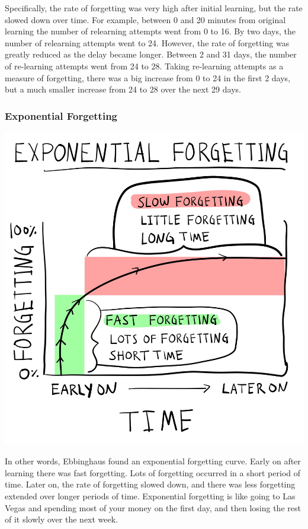 \documentclass[
  oneside,
  12pt]{crumpbook}
\newenvironment{floatright50}{%
  \wrapfigure{R}{.5\textwidth}%
  }{%
  \endwrapfigure}
\begin{document}
Specifically, the rate of forgetting was very high after initial learning, but the rate slowed down over time. For example, between 0 and 20 minutes from original learning the number of relearning attempts went from 0 to 16. By two days, the number of relearning attempts went to 24. However, the rate of forgetting was greatly reduced as the delay became longer. Between 2 and 31 days, the number of re-learning attempts went from 24 to 28. Taking re-learning attempts as a measure of forgetting, there was a big increase from 0 to 24 in the first 2 days, but a much smaller increase from 24 to 28 over the next 29 days.

\hypertarget{exponential-forgetting}{%
\subsubsection{Exponential Forgetting}\label{exponential-forgetting}}

\begin{floatright50}
\includegraphics[width=1\linewidth]{imgs/Ebbinghaus_exp}

\end{floatright50}

In other words, Ebbinghaus found an exponential forgetting curve. Early on after learning there was fast forgetting. Lots of forgetting occurred in a short period of time. Later on, the rate of forgetting slowed down, and there was less forgetting extended over longer periods of time. Exponential forgetting is like going to Las Vegas and spending most of your money on the first day, and then losing the rest of it slowly over the next week.
\end{document}
